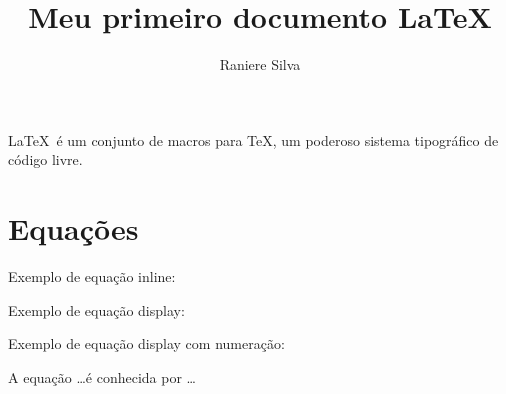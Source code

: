 \documentclass{article}
\title{Meu primeiro documento \LaTeX}
\author{Raniere Silva}
\begin{document}
\maketitle

\LaTeX \ é um conjunto de macros para \TeX, um poderoso sistema tipográfico
de código livre.

\section{Equações}

Exemplo de equação inline:

Exemplo de equação display:

Exemplo de equação display com numeração:

A equação \ldots é conhecida por \ldots
\end{document}
